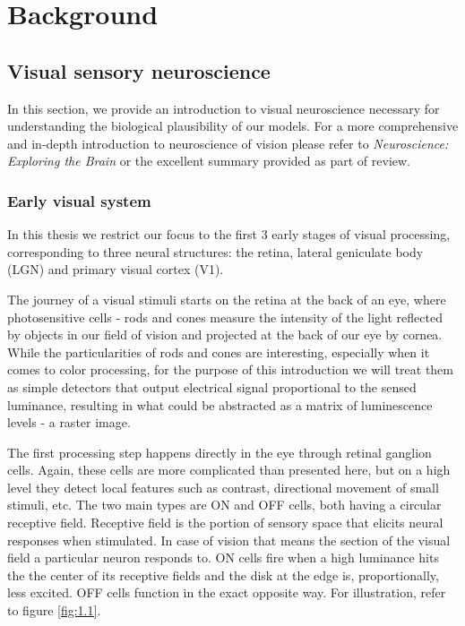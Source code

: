 \chapter{Background}\label{ch:1}

\section{Visual sensory neuroscience}
In this section, we provide an introduction to visual neuroscience necessary for understanding the biological plausibility of our models. For a more comprehensive and in-depth introduction to neuroscience of vision please refer to \textit{Neuroscience: Exploring the Brain} \citep{bear_neuroscience:_2007} or the excellent summary provided as part of \cite{Carandini10577} review.

\subsection{Early visual system}\label{ch:1.1.1}
In this thesis we restrict our focus to the first 3 early stages of visual processing, corresponding to three neural structures: the retina, lateral geniculate body (LGN) and primary visual cortex (V1).

The journey of a visual stimuli starts on the retina at the back of an eye, where photosensitive cells - rods and cones measure the intensity of the light reflected by objects in our field of vision and projected at the back of our eye by cornea. While the particularities of rods and cones are interesting, especially when it comes to color processing, for the purpose of this introduction we will treat them as simple detectors that output electrical signal proportional to the sensed luminance, resulting in what could be abstracted as a matrix of luminescence levels - a raster image. 

The first processing step happens directly in the eye through retinal ganglion cells. Again, these cells are more complicated than presented here, but on a high level they detect local features such as contrast, directional movement of small stimuli, etc. The two main types are ON and OFF cells, both having a circular receptive field. Receptive field is the portion of sensory space that elicits neural responses when stimulated. In case of vision that means the section of the visual field a particular neuron responds to. ON cells fire when a high luminance hits the the center of its receptive fields and the disk at the edge is, proportionally, less excited. OFF cells function in the exact opposite way. For illustration, refer to figure \ref{fig:1.1}.

